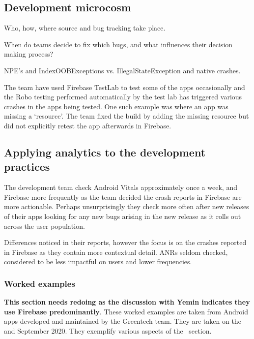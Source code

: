 \subsection{Development microcosm}
Who, how, where source and bug tracking take place. 

When do teams decide to fix which bugs, and what influences their decision making process?

NPE's and IndexOOBExceptions vs. IllegalStateException and native crashes.

The team have used Firebase TestLab to test some of the apps occasionally and the Robo testing performed automatically by the test lab has triggered various crashes in the apps being tested. One such example was where an app was missing a `resource'. The team fixed the build by adding the missing resource but did not explicitly retest the app afterwards in Firebase. 

\subsection{Applying analytics to the development practices}

The development team check Android Vitals approximately once a week, and Firebase more frequently as the team decided the crash reports in Firebase are more actionable. Perhaps unsurprisingly they check more often after new releases of their apps looking for any new bugs arising in the new release as it rolls out across the user population.



Differences noticed in their reports, however the focus is on the crashes reported in Firebase as they contain more contextual detail. ANRs seldom checked, considered to be less impactful on users and lower frequencies.

\subsubsection{Worked examples}
\textbf{This section needs redoing as the discussion with Yemin indicates they use Firebase predominantly}.
These worked examples are taken from Android apps developed and maintained by the Greentech team. They are taken on the  and  September 2020. They exemplify various aspects of the~\href{section-select-aggregate-scope-analyse-triage-and-prioritise}{\MakeLowercase{\emph{}}} section. %



